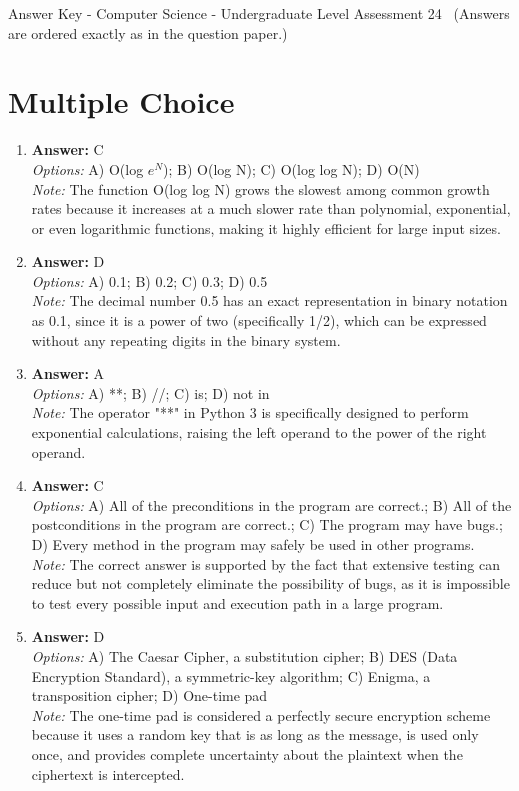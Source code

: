 \documentclass[12pt]{article}
\begin{document}
\begin{center}
Answer Key - Computer Science - Undergraduate Level Assessment 24 \
\small (Answers are ordered exactly as in the question paper.)
\end{center}

\section*{Multiple Choice}
\begin{enumerate}[label=\arabic*.]
\item \textbf{Answer:} C
\\ \textit{Options:} A) O(log $e^N$); B) O(log N); C) O(log log N); D) O(N)
\\ \textit{Note:} The function O(log log N) grows the slowest among common growth rates because it increases at a much slower rate than polynomial, exponential, or even logarithmic functions, making it highly efficient for large input sizes.
\item \textbf{Answer:} D
\\ \textit{Options:} A) 0.1; B) 0.2; C) 0.3; D) 0.5
\\ \textit{Note:} The decimal number 0.5 has an exact representation in binary notation as 0.1, since it is a power of two (specifically 1/2), which can be expressed without any repeating digits in the binary system.
\item \textbf{Answer:} A
\\ \textit{Options:} A) **; B) //; C) is; D) not in
\\ \textit{Note:} The operator "**" in Python 3 is specifically designed to perform exponential calculations, raising the left operand to the power of the right operand.
\item \textbf{Answer:} C
\\ \textit{Options:} A) All of the preconditions in the program are correct.; B) All of the postconditions in the program are correct.; C) The program may have bugs.; D) Every method in the program may safely be used in other programs.
\\ \textit{Note:} The correct answer is supported by the fact that extensive testing can reduce but not completely eliminate the possibility of bugs, as it is impossible to test every possible input and execution path in a large program.
\item \textbf{Answer:} D
\\ \textit{Options:} A) The Caesar Cipher, a substitution cipher; B) DES (Data Encryption Standard), a symmetric-key algorithm; C) Enigma, a transposition cipher; D) One-time pad
\\ \textit{Note:} The one-time pad is considered a perfectly secure encryption scheme because it uses a random key that is as long as the message, is used only once, and provides complete uncertainty about the plaintext when the ciphertext is intercepted.
\end{enumerate}
\end{document}
